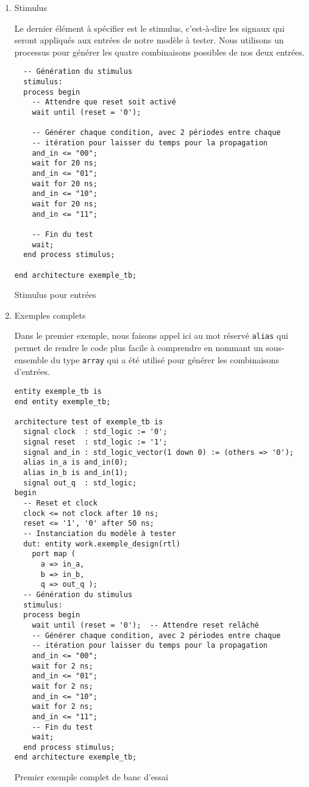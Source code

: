 \documentclass[letter, oneside]{book}
\begin{document}
\begin{enumerate}
\item Stimulus
\label{sec:org95218c8}

Le dernier élément à spécifier est le stimulus, c'est-à-dire les
signaux qui seront appliqués aux entrées de notre modèle à
tester. Nous utilisons un processus pour générer les quatre
combinaisons possibles de nos deux entrées.

\begin{listing}[htbp]
\begin{verbatim}
  -- Génération du stimulus
  stimulus:
  process begin
    -- Attendre que reset soit activé
    wait until (reset = '0');

    -- Générer chaque condition, avec 2 périodes entre chaque
    -- itération pour laisser du temps pour la propagation
    and_in <= "00";
    wait for 20 ns;
    and_in <= "01";
    wait for 20 ns;
    and_in <= "10";
    wait for 20 ns;
    and_in <= "11";

    -- Fin du test
    wait;
  end process stimulus;

end architecture exemple_tb;
\end{verbatim}
\caption{Stimulus pour entrées}
\end{listing}

\item Exemples complets
\label{sec:orgbde05ef}

Dans le premier exemple, nous faisons appel ici au mot réservé \texttt{alias}
qui permet de rendre le code plus facile à comprendre en nommant un
sous-ensemble du type \texttt{array} qui a été utilisé pour générer les
combinaisons d'entrées.

\begin{listing}[htbp]
\begin{verbatim}
entity exemple_tb is
end entity exemple_tb;

architecture test of exemple_tb is
  signal clock  : std_logic := '0';
  signal reset  : std_logic := '1';
  signal and_in : std_logic_vector(1 down 0) := (others => '0');
  alias in_a is and_in(0);
  alias in_b is and_in(1);
  signal out_q  : std_logic;
begin
  -- Reset et clock
  clock <= not clock after 10 ns;
  reset <= '1', '0' after 50 ns;
  -- Instanciation du modèle à tester 
  dut: entity work.exemple_design(rtl)
    port map (
      a => in_a,
      b => in_b,
      q => out_q );
  -- Génération du stimulus
  stimulus:
  process begin
    wait until (reset = '0');  -- Attendre reset relâché
    -- Générer chaque condition, avec 2 périodes entre chaque
    -- itération pour laisser du temps pour la propagation
    and_in <= "00";
    wait for 2 ns;
    and_in <= "01";
    wait for 2 ns;
    and_in <= "10";
    wait for 2 ns;
    and_in <= "11";
    -- Fin du test
    wait;
  end process stimulus;
end architecture exemple_tb;
\end{verbatim}
\caption{Premier exemple complet de banc d'essai}
\end{listing}


\end{enumerate}
\end{document}
